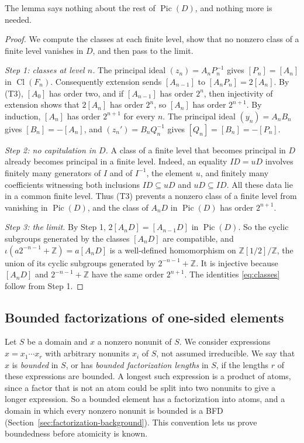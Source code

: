 \documentclass[11pt]{article}
\theoremstyle{plain}
\theoremstyle{definition}
\theoremstyle{remark}
\DeclareMathOperator{\Pic}{Pic}
\DeclareMathOperator{\Cl}{Cl}
\newcommand{\Z}{\mathbb Z}
\begin{document}
The lemma says nothing about the rest of $\Pic(D)$, and nothing more is
needed.

\begin{proof}
We compute the classes at each finite level, show that no nonzero class
of a finite level vanishes in $D$, and then pass to the limit.

\emph{Step 1: classes at level $n$.}  The principal ideal
$(z_n)=A_nP_n^{-1}$ gives $[P_n]=[A_n]$ in $\Cl(F_n)$.  Consequently
extension sends $[A_{n-1}]$ to $[A_nP_n]=2[A_n]$.  By (T3), $[A_0]$ has
order two, and if $[A_{n-1}]$ has order $2^n$, then injectivity of
extension shows that $2[A_n]$ has order $2^n$, so $[A_n]$ has order
$2^{n+1}$.  By induction, $[A_n]$ has order $2^{n+1}$ for every $n$.  The
principal ideal $(y_n)=A_nB_n$ gives $[B_n]=-[A_n]$, and
$(z_n')=B_nQ_n^{-1}$ gives $[Q_n]=[B_n]=-[P_n]$.

\emph{Step 2: no capitulation in $D$.}  A class of a finite level that
becomes principal in $D$ already becomes principal in a finite level.
Indeed, an equality $ID=uD$ involves finitely many generators of $I$ and
of $I^{-1}$, the element $u$, and finitely many coefficients witnessing
both inclusions $ID\subseteq uD$ and $uD\subseteq ID$.  All these data lie
in a common finite level.  Thus (T3) prevents a nonzero class of a finite
level from vanishing in $\Pic(D)$, and the class of $A_nD$ in $\Pic(D)$
has order $2^{n+1}$.

\emph{Step 3: the limit.}  By Step 1, $2[A_nD]=[A_{n-1}D]$ in $\Pic(D)$.
So the cyclic subgroups generated by the classes $[A_nD]$ are compatible,
and $\iota(a2^{-n-1}+\Z)=a[A_nD]$ is a well-defined homomorphism on
$\Z[1/2]/\Z$, the union of its cyclic subgroups generated by
$2^{-n-1}+\Z$.  It is injective because $[A_nD]$ and $2^{-n-1}+\Z$ have the
same order $2^{n+1}$.  The identities \eqref{eq:classes} follow from
Step 1.
\end{proof}

\subsection{Bounded factorizations of one-sided elements}\label{sec:onesided}

Let $S$ be a domain and $x$ a nonzero nonunit of $S$.  We consider
expressions $x=x_1\cdots x_r$ with arbitrary nonunits $x_i$ of $S$, not
assumed irreducible.  We say that $x$ is \emph{bounded} in $S$, or has
\emph{bounded factorization lengths} in $S$, if the lengths $r$ of these
expressions are bounded.  A longest such expression is a product of
atoms, since a factor that is not an atom could be split into two
nonunits to give a longer expression.  So a bounded element has a
factorization into atoms, and a domain in which every nonzero nonunit is
bounded is a BFD (Section~\ref{sec:factorization-background}).  This
convention lets us prove boundedness before atomicity is known.
\end{document}
